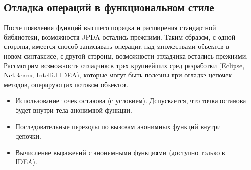 \subsection{Отладка операций в функциональном стиле}
После появления функций высшего порядка и расширения стандартной библиотеки, возможности JPDA остались прежними. Таким образом, с одной стороны, имеется способ записывать операции над множествами объектов в новом синтаксисе, с другой стороны, возможности отладчика остались прежними. Рассмотрим возможности отладчиков трех крупнейших сред разработки (Eclipse, NetBeans, IntelliJ IDEA), которые могут быть полезны при отладке цепочек методов, оперирующих потоком объектов.

\begin{itemize}
	\item Использование точек останова (с условием). Допускается, что точка останова будет внутри тела анонимной функции.
	\item Последовательные переходы по вызовам анонимных функций внутри цепочки.
	\item Вычисление выражений с анонимными функциями (доступно только в IDEA).
\end{itemize}

